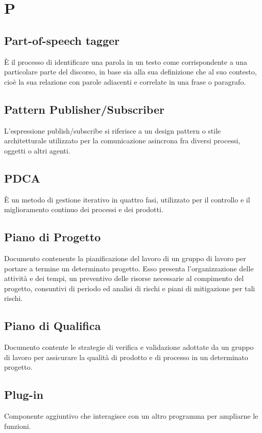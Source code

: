 \section*{P}

\subsection{Part-of-speech tagger}
È il processo di identificare una parola in un testo come corrispondente a una particolare parte del discorso, in base sia alla sua definizione che al suo contesto, cioè la sua relazione con parole adiacenti e correlate in una frase o paragrafo.

\subsection{Pattern Publisher/Subscriber}
L'espressione publish/subscribe si riferisce a un design pattern o stile architetturale utilizzato per la comunicazione asincrona fra diversi processi, oggetti o altri agenti.

\subsection{PDCA}
È un metodo di gestione iterativo in quattro fasi, utilizzato per il controllo e il miglioramento continuo dei processi e dei prodotti.

\subsection{Piano di Progetto}
Documento contenente la pianificazione del lavoro di un gruppo di lavoro per portare a termine un determinato progetto. Esso presenta l'organizzazione delle attività e dei tempi, un preventivo delle risorse necessarie al compimento del progetto, consuntivi di periodo ed analisi di rischi e piani di mitigazione per tali rischi.

\subsection{Piano di Qualifica}
Documento contente le strategie di verifica e validazione adottate da un gruppo di lavoro per assicurare la qualità di prodotto e di processo in un determinato progetto.

\subsection{Plug-in}
Componente aggiuntivo che interagisce con un altro programma per ampliarne le funzioni.

